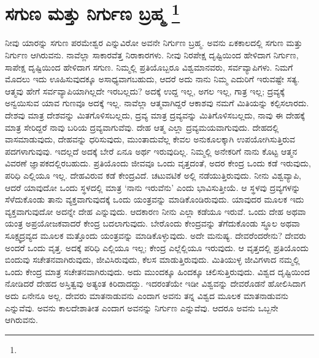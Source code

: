 
\chapter[ಸುಗುಣ ಮತ್ತು ನಿರ್ಗುಣ ಬ್ರಹ್ಮ ]{ಸಗುಣ ಮತ್ತು ನಿರ್ಗುಣ ಬ್ರಹ್ಮ \protect\footnote{}}

ನೀವು ಯಾರನ್ನು ಸಗುಣ ಪರಮೇಶ್ವರ ಎನ್ನುವಿರೋ ಅವನೇ ನಿರ್ಗುಣ ಬ್ರಹ್ಮ. ಅವನು ಏಕಕಾಲದಲ್ಲಿ ಸಗುಣ ಮತ್ತು ನಿರ್ಗುಣ ಆಗಿರುವನು. ನಾವೆಲ್ಲಾ ಸಾಕಾರವೆತ್ತ ನಿರಾಕಾರಗಳು. ನೀವು ನಿರಪೇಕ್ಷ ದೃಷ್ಟಿಯಿಂದ ಹೇಳಿದಾಗ ನಿರ್ಗುಣ, ಸಾಪೇಕ್ಷ ದೃಷ್ಟಿಯಿಂದ ಹೇಳಿದಾಗ ಸಗುಣ. ನಿಮ್ಮಲ್ಲಿ ಪ್ರತಿಯೊಬ್ಬರೂ ವಿಶ್ವಮಾನವರು, ಸರ್ವವ್ಯಾಪಿಗಳು. ನಿಮಗೆ ಮೊದಲು ಇದು ಊಹಿಸುವುದಕ್ಕೂ ಅಸಾಧ್ಯವಾಗಬಹುದು, ಆದರೆ ಅದು ನಾನು ನಿಮ್ಮ ಎದುರಿಗೆ ಇರುವಷ್ಟೇ ಸತ್ಯ. ಆತ್ಮವು ಹೇಗೆ ಸರ್ವವ್ಯಾಪಿಯಾಗಿಲ್ಲದೇ ಇರಬಲ್ಲದು? ಅದಕ್ಕೆ ಉದ್ದ ಇಲ್ಲ, ಅಗಲ ಇಲ್ಲ, ಗಾತ್ರ ಇಲ್ಲ; ದ್ರವ್ಯಕ್ಕೆ ಅನ್ವಯಿಸುವ ಯಾವ ಗುಣವೂ ಅದಕ್ಕೆ ಇಲ್ಲ. ನಾವೆಲ್ಲಾ ಆತ್ಮವಾಗಿದ್ದರೆ ಆಕಾಶವು ನಮಗೆ ಮಿತಿಯನ್ನು ಕಲ್ಪಿಸಲಾರದು. ದೇಶವು ಮಾತ್ರ ದೇಶವನ್ನು ಮಿತಗೊಳಿಸಬಲ್ಲದು, ದ್ರವ್ಯ ಮಾತ್ರ ದ್ರವ್ಯವನ್ನು ಮಿತಿಗೊಳಿಸಬಲ್ಲದು, ನಾವು ಈ ದೇಹಕ್ಕೆ ಮಾತ್ರ ಸೇರಿದ್ದರೆ ನಾವು ಬರಿಯ ದ್ರವ್ಯವಾಗುವೆವು. ದೇಹ ಆತ್ಮ ಎಲ್ಲಾ ದ್ರವ್ಯಮಯವಾಗುವುದು. ದೇಹದಲ್ಲಿ ವಾಸಮಾಡುವುದು, ದೇಹವನ್ನು ಧರಿಸುವುದು, ಮುಂತಾದುವೆಲ್ಲ ಕೇವಲ ಅನುಕೂಲಕ್ಕಾಗಿ ಉಪಯೋಗಿಸುತ್ತಿರುವ ಪದಗಳಾಗುವುವು. ಇದಲ್ಲದೆ ಅದಕ್ಕೆ ಬೇರೆ ಏನೂ ಅರ್ಥ ಇರುವುದಿಲ್ಲ. ನಿಮ್ಮಲ್ಲಿ ಅನೇಕರಿಗೆ ನಾನು ಕೊಟ್ಟ ಆತ್ಮನ ವಿವರಣೆ ಜ್ಞಾಪಕದಲ್ಲಿರಬಹುದು. ಪ್ರತಿಯೊಂದು ಜೀವವೂ ಒಂದು ವೃತ್ತದಂತೆ, ಅದರ ಕೇಂದ್ರ ಒಂದು ಕಡೆ ಇರುವುದು, ಪರಿಧಿ ಎಲ್ಲಿಯೂ ಇಲ್ಲ. ದೇಹವಿರುವ ಕಡೆ ಕೇಂದ್ರವಿದೆ. ಚಟುವಟಿಕೆ ಅಲ್ಲಿ ನಡೆಯುತ್ತಿರುವುದು. ನೀನು ವಿಶ್ವವ್ಯಾಪಿ, ಆದರೆ ಯಾವುದೋ ಒಂದು ಸ್ಥಳದಲ್ಲಿ ಮಾತ್ರ ‘ನಾನು ಇರುವೆನು’ ಎಂದು ಭಾವಿಸುತ್ತೀಯೆ. ಆ ಸ್ಥಳವು ದ್ರವ್ಯಗಳನ್ನು ಸೆಳೆದುಕೊಂಡು ತಾನು ವ್ಯಕ್ತವಾಗುವುದಕ್ಕೆ ಒಂದು ಯಂತ್ರವನ್ನು ಮಾಡಿಕೊಂಡಿರುವುದು. ಯಾವುದರ ಮೂಲಕ ಇದು ವ್ಯಕ್ತವಾಗುವುದೋ ಅದನ್ನೇ ದೇಹ ಎನ್ನುವುದು. ಆದಕಾರಣ ನೀನು ಎಲ್ಲಾ ಕಡೆಯೂ ಇರುವೆ. ಒಂದು ದೇಹ ಅಥವಾ ಯಂತ್ರ ಅಪ್ರಯೋಜಕವಾದರೆ ಕೇಂದ್ರ ಬದಲಾಗುವುದು. ಬೇರೊಂದು ಕೇಂದ್ರವನ್ನು ತೆಗೆದುಕೊಂಡು ಸ್ಥೂಲ ಅಥವಾ ಸೂಕ್ಷ್ಮದ್ರವ್ಯದ ಮೂಲಕ ಮತ್ತೊಂದು ಯಂತ್ರವನ್ನು ಮಾಡಿಕೊಳ್ಳುವುದು. ಅದೇ ಮನುಷ್ಯ. ದೇವರೆಂದರೇನು? ದೇವರು ಅಂದರೆ ಒಂದು ವೃತ್ತ. ಅದಕ್ಕೆ ಪರಿಧಿ ಎಲ್ಲಿಯೂ ಇಲ್ಲ; ಕೇಂದ್ರ ಎಲ್ಲೆಲ್ಲಿಯೂ ಇರುವುದು. ಆ ವೃತ್ತದಲ್ಲಿ ಪ್ರತಿಯೊಂದು ಬಿಂದುವು ಸಚೇತನವಾಗಿರುವುದು, ಜೀವಿಸಿರುವುದು, ಕೆಲಸ ಮಾಡುತ್ತಿರುವುದು. ಮಿತಿಯುಳ್ಳ ಜೀವಿಗಳಾದ ನಮ್ಮಲ್ಲಿ ಒಂದು ಕೇಂದ್ರ ಮಾತ್ರ ಸಚೇತನವಾಗಿರುವುದು. ಅದು ಮುಂದಕ್ಕೂ ಹಿಂದಕ್ಕೂ ಚಲಿಸುತ್ತಿರುವುದು. ವಿಶ್ವದ ದೃಷ್ಟಿಯಿಂದ ನೋಡಿದರೆ ದೇಹದ ಅಸ್ತಿತ್ವವು ಅತ್ಯಂತ ಕಿರಿದಾದದ್ದು. ಇದರಂತೆಯೇ ಇಡೀ ವಿಶ್ವವನ್ನು ದೇವರೊಡನೆ ಹೋಲಿಸಿದಾಗ ಅದು ಏನೇನೂ ಅಲ್ಲ. ದೇವರು ಮಾತನಾಡುವನು ಎಂದಾಗ ಅವನು ತನ್ನ ವಿಶ್ವದ ಮೂಲಕ ಮಾತನಾಡುವನು ಎನ್ನುವೆವು. ಅವನು ಕಾಲದೇಶಾತೀತ ಎಂದಾಗ ಅವನನ್ನು ನಿರ್ಗುಣ ಎನ್ನುವೆವು. ಆದರೂ ಅವನು ಒಬ್ಬನೇ ಆಗಿರುವನು.

\vskip 6pt

